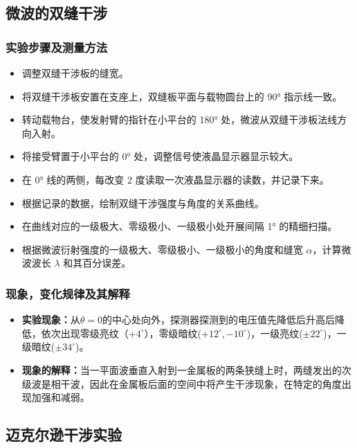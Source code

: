 \documentclass[zihao=5, UTF8]{article}
\theoremstyle{MyLineTheoremStyle} %
\theoremstyle{MyBlockTheoremStyle} %
\theoremstyle{MySubsubsectionStyle} %
\begin{document}
\subsection{微波的双缝干涉}
\subsubsection{实验步骤及测量方法}
\begin{itemize}
    \item 调整双缝干涉板的缝宽。
    \item 将双缝干涉板安置在支座上，双缝板平面与载物圆台上的 90° 指示线一致。
    \item 转动载物台，使发射臂的指针在小平台的 180° 处，微波从双缝干涉板法线方向入射。
    \item 将接受臂置于小平台的 0° 处，调整信号使液晶显示器显示较大。
    \item 在 0° 线的两侧，每改变 2 度读取一次液晶显示器的读数，并记录下来。
    \item 根据记录的数据，绘制双缝干涉强度与角度的关系曲线。
    \item 在曲线对应的一级极大、零级极小、一级极小处开展间隔 1° 的精细扫描。
    \item 根据微波衍射强度的一级极大、零级极小、一级极小的角度和缝宽 $\alpha$，计算微波波长 $\lambda$ 和其百分误差。
\end{itemize}
\subsubsection{现象，变化规律及其解释}
\begin{itemize}
    \item \textbf{实验现象：}从$\theta = 0$的中心处向外，探测器探测到的电压值先降低后升高后降低，依次出现零级亮纹（$+4^\circ$），零级暗纹($+12^\circ, -10^\circ$)，一级亮纹($\pm 22^\circ$)，一级暗纹($\pm 34^\circ$)。
    \item \textbf{现象的解释：}当一平面波垂直入射到一金属板的两条狭缝上时，两缝发出的次级波是相干波，因此在金属板后面的空间中将产生干涉现象，在特定的角度出现加强和减弱。
\end{itemize}

\subsection{迈克尔逊干涉实验}
\end{document}
